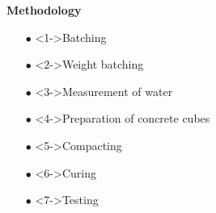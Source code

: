 \documentclass[aspectratio=169]{beamer}
\begin{document}
\begin{frame}{\textbf{Methodology}}
      \begin{itemize}
          \large\item[$\bullet$] <1->Batching
           \vspace{0.4cm}
          \large\item[$\bullet$]<2->Weight batching
           \vspace{0.4cm}
          \large\item[$\bullet$] <3->Measurement of water
         \vspace{0.4cm}
         \item[$\bullet$]<4->Preparation of concrete cubes
         \vspace{0.4cm}
         \item[$\bullet$]<5->Compacting
         \vspace{0.4cm}
         \item[$\bullet$]<6->Curing
         \vspace{0.4cm}
         \item[$\bullet$]<7->Testing
          \end{itemize}
  \end{frame}
\end{document}
